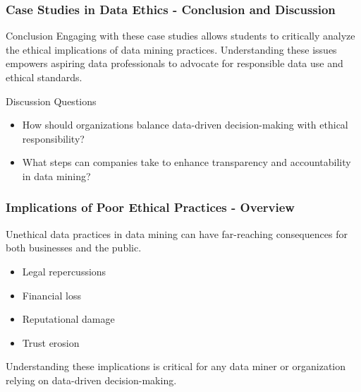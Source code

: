 \documentclass[aspectratio=169]{beamer}
\begin{document}
\begin{frame}[fragile]
    \frametitle{Case Studies in Data Ethics - Conclusion and Discussion}
    \begin{block}{Conclusion}
        Engaging with these case studies allows students to critically analyze the ethical implications of data mining practices. Understanding these issues empowers aspiring data professionals to advocate for responsible data use and ethical standards.
    \end{block}

    \begin{block}{Discussion Questions}
        \begin{itemize}
            \item How should organizations balance data-driven decision-making with ethical responsibility?
            \item What steps can companies take to enhance transparency and accountability in data mining?
        \end{itemize}
    \end{block}
\end{frame}

\begin{frame}[fragile]
    \frametitle{Implications of Poor Ethical Practices - Overview}
    Unethical data practices in data mining can have far-reaching consequences for both businesses and the public. 
    \begin{itemize}
        \item Legal repercussions
        \item Financial loss
        \item Reputational damage
        \item Trust erosion
    \end{itemize}
    Understanding these implications is critical for any data miner or organization relying on data-driven decision-making.
\end{frame}
\end{document}
